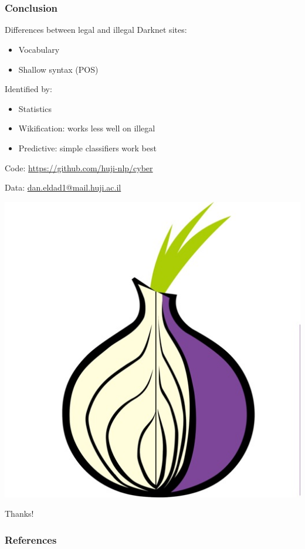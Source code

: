 \documentclass[t,xcolor={svgnames,table}]{beamer}
\begin{document}
\section*{}

\begin{frame}
	\frametitle{Conclusion}
	Differences between legal and illegal Darknet sites:	
	\begin{itemize}\setlength\itemsep{1em}
	\item Vocabulary
	\item Shallow syntax (POS)
	\end{itemize}
	\vfill
	\pause
	
	Identified by:
	\begin{itemize}\setlength\itemsep{1em}
	\item Statistics
	\item Wikification: works less well on illegal
	\item Predictive: simple classifiers work best
	\end{itemize}
	\vfill
	\pause
	
	\begin{minipage}{.7\textwidth}
	Code: {\color{blue}\url{https://github.com/huji-nlp/cyber}}
	
	Data: {\color{blue}\url{dan.eldad1@mail.huji.ac.il}}
	\end{minipage}
	\pause
	\begin{minipage}{.28\textwidth}
	\centering\vspace{-2cm}
	\includegraphics[width=.8\textwidth]{onion.jpg}
	
	Thanks!
	\end{minipage}
\end{frame}

\begin{frame}[allowframebreaks]
\frametitle{References}

\tiny
\end{frame}
\end{document}
